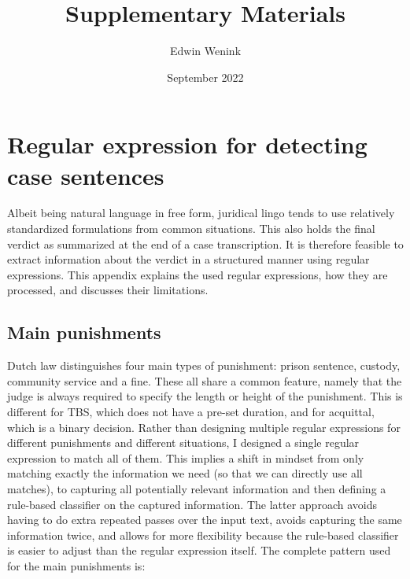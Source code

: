 \documentclass[a4paper]{article}
\title{Supplementary Materials}
\date{September 2022}
\author{Edwin Wenink}
\begin{document}
\maketitle
\tableofcontents

\section{Regular expression for detecting case sentences}\label{sec:regex}

Albeit being natural language in free form, juridical lingo tends to use relatively standardized formulations from common situations.
This also holds the final verdict as summarized at the end of a case transcription.
It is therefore feasible to extract information about the verdict in a structured manner using regular expressions.
This appendix explains the used regular expressions, how they are processed, and discusses their limitations.

\subsection{Main punishments}

Dutch law distinguishes four main types of punishment: prison sentence, custody, community service and a fine.
These all share a common feature, namely that the judge is always required to specify the length or height of the punishment.
This is different for TBS, which does not have a pre-set duration, and for acquittal, which is a binary decision.
Rather than designing multiple regular expressions for different punishments and different situations, I designed a single regular expression to match all of them.
This implies a shift in mindset from only matching exactly the information we need (so that we can directly use all matches), to capturing all potentially relevant information and then defining a rule-based classifier on the captured information.
The latter approach avoids having to do extra repeated passes over the input text, avoids capturing the same information twice, and allows for more flexibility because the rule-based classifier is easier to adjust than the regular expression itself.
The complete pattern used for the main punishments is:
\end{document}
